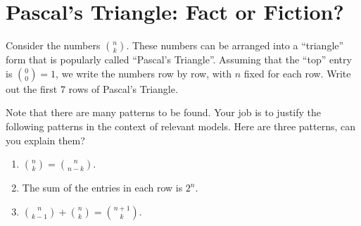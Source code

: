 \newpage
\section{Pascal's Triangle: Fact or Fiction?}\label{A:factOrFiction}

Consider the numbers $\binom{n}{k}$.  These numbers can be arranged
into a ``triangle'' form that is popularly called ``Pascal's
Triangle''.  Assuming that the ``top'' entry is $\binom{0}{0}=1$, we
write the numbers row by row, with $n$ fixed for each row.  Write out
the first 7 rows of Pascal's Triangle.

\vspace{4in}


Note that there are many patterns to be found.  Your job is to justify
the following patterns in the context of relevant models. Here are three patterns, can you explain them?
\begin{enumerate}
\item $\binom{n}{k} = \binom{n}{n-k}$.
\item The sum of the entries in each row is $2^n$.
\item $\binom{n}{k-1} + \binom{n}{k} = \binom{n+1}{k}$.
\end{enumerate}


